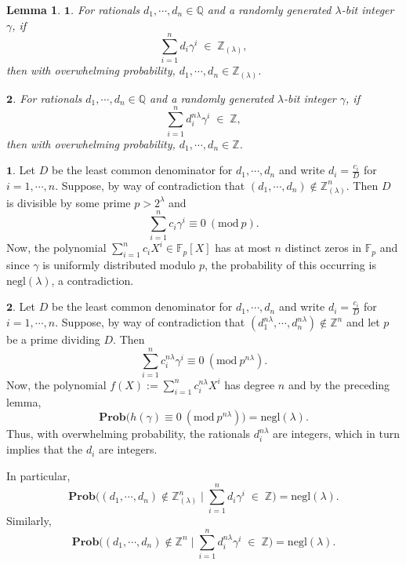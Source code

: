\documentclass[11pt, lettersize, notitlepage, leqno, footskip=0.6cm]{article}
\newcommand{\bz}{\mathbb Z}
\newcommand{\bq}{\mathbb Q}
\newcommand{\bFp}{\mathbb{F}_p}
\newcommand{\slim}{\sum\limits}
\newcommand{\negl}{\mr{negl}}
\newcommand{\mbf}{\mathbf}
\newcommand{\mr}{\mathrm}
\newcommand{\lam}{\lambda}
\newcommand{\lamb}{\lambda}
\newcommand{\bzlam}{\bz_{(\lam)}}
\newcommand{\Prob}{\mbf{Prob}}
\newcommand{\vs}{\vspace{-0.15cm}}
\newcommand{\noin}{\noindent}
\newcommand{\op}{overwhelming probability}
\newcommand{\Mod}[1]{\ (\mathrm{mod}\ #1)}
\newtheorem{Lem}[Thm]{Lemma}
\numberwithin{equation}{section}
\begin{document}
\begin{Lem}$\mbf{1}$. For rationals $d_1,\cdots, d_n\in \bq$ and a randomly generated $\lam$-bit integer $\gamma$, if \vs$$\sum\limits_{i=1}^n d_i\gamma^i\; \in \;\bzlam,$$ then with \op, $d_1,\cdots, d_n\in \bzlam$.\vspace{0.1cm}

\noin $\mbf{2}$. For rationals $d_1,\cdots, d_n\in \bq$ and a randomly generated $\lam$-bit integer $\gamma$, if \vs $$\slim_{i=1}^n d_i^{n\lam}\gamma^i\; \in \;\bz,$$ then with \op, $d_1,\cdots, d_n\in \bz$.\end{Lem}

\begin{prf} $\mbf{1}$. Let $D$ be the least common denominator for $d_1,\cdots, d_n$ and write $d_i = \frac{c_i}{D}$ for $i=1,\cdots, n.$ Suppose, by way of contradiction that $(d_1,\cdots, d_n )\notin \bzlam^n$. Then $D$ is divisible by some prime $p>2^{\lam}$ and \vs $$\sum\limits_{i=1}^n  {c_i\gamma^i} \equiv 0\Mod{p}.$$ Now, the polynomial $\sum\limits_{i=1}^n c_iX^i \in \bFp[X]$ has at most $n$ distinct zeros in $\bFp$ and since $\gamma$ is uniformly distributed modulo $p$, the probability of this occurring is $\negl(\lamb)$, a contradiction.\vspace{0.15cm} 

\noin $\mbf{2}$. Let $D$ be the least common denominator for $d_1,\cdots, d_n$ and write $d_i = \frac{c_i}{D}$ for $i=1,\cdots, n.$ Suppose, by way of contradiction that $(d_1^{n\lam},\cdots, d_n^{n\lam} )\notin \bz^n$ and let $p$ be a prime dividing $D$. Then $$\slim_{i=1}^n c_i^{n\lam}\gamma^i \equiv 0\Mod{p^{n\lam}}.$$ Now, the polynomial $f(X):= \slim_{i=1}^n c_i^{n\lam} X^i$ has degree $n$ and by the preceding lemma, \vs $$\mbf{Prob}\big(h(\gamma)\equiv 0\Mod{p^{n\lam}} \big) = \negl(\lam).$$ Thus, with \op, the rationals $d_i^{n\lam}$ are integers, which in turn implies that the $d_i$ are integers.\end{prf}


\begin{comment}
For the second part, note that \vs $$\Prob\big(\sum\limits_{i=1}^n d_i\gamma_j^i\in \bz\;\forall j\big|\; (d_1,\cdots,d_n)\notin \bz\big ) = \Prob\big(\sum\limits_{i=1}^n d_i\gamma^i\in \bz\big|\; (d_1,\cdots,d_n)\notin \bz\big )^{\lam} = \negl(\lam).$$\end{comment}

\noindent In particular, \vs $$\mbf{Prob}\big((d_1,\cdots, d_n)\notin \bzlam^n \;\Big|\;\sum\limits_{i=1}^n d_i\gamma^i\; \in \;\bz \big) = \negl(\lamb).$$ Similarly, \vs $$ \mbf{Prob}\big((d_1,\cdots, d_n)\notin \bz^n \;\Big|\;\sum\limits_{i=1}^n d_i^{n\lam}\gamma^i\; \in \;\bz \big) = \negl(\lamb). $$
\end{document}
